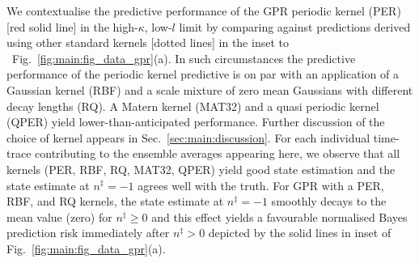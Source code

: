 We contextualise the predictive performance of the GPR periodic kernel (PER) [red solid line] in the high-$\kappa$, low-$l$ limit by comparing against predictions derived using other standard kernels [dotted lines] in the inset to ~Fig.~\ref{fig:main:fig_data_gpr}(a). In such circumstances the predictive performance of the periodic kernel predictive is on par with an application of a Gaussian kernel (RBF) and a scale mixture of zero mean Gaussians with different decay lengths (RQ).  A Matern kernel (MAT32) and a quasi periodic kernel (QPER) yield lower-than-anticipated performance. Further discussion of the choice of kernel appears in Sec.~\ref{sec:main:discussion}. For each individual time-trace contributing to the ensemble averages appearing here, we observe that all kernels (PER, RBF, RQ, MAT32, QPER) yield good state estimation and the state estimate at $n^\ddagger=-1$ agrees well with the truth. For GPR with a PER, RBF, and RQ kernels, the state estimate at $n^\ddagger=-1$ smoothly decays to the mean value (zero) for $n^\ddagger \geq 0$ and this effect yields a favourable normalised Bayes prediction risk immediately after $n^\ddagger>0$ depicted by the solid lines in inset of Fig.~\ref{fig:main:fig_data_gpr}(a).

